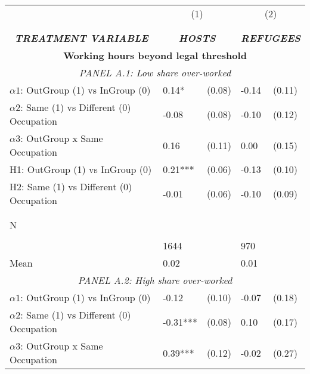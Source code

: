 \begin{tabular}{l*{4}{l}} \toprule 
                &\multicolumn{2}{c}{(1)}&\multicolumn{2}{c}{(2)}\\
                &\multicolumn{2}{c}{ } &\multicolumn{2}{c}{ } \\
\\[-0.6cm] \multicolumn{1}{c}{\textit{\textbf{TREATMENT VARIABLE}}} & \multicolumn{2}{c}{\textit{\textbf{HOSTS}}} & \multicolumn{2}{c}{\textit{\textbf{REFUGEES}}} \\ \midrule   \multicolumn{5}{c}{\textbf{Working hours beyond legal threshold}} \\ \multicolumn{5}{c}{\textit{PANEL A.1: Low share over-worked}} \\  \midrule  
$\alpha1$: OutGroup (1) vs InGroup (0)&     0.14*  &   (0.08)&    -0.14   &   (0.11)\\
$\alpha2$: Same (1) vs Different (0) Occupation&    -0.08   &   (0.08)&    -0.10   &   (0.12)\\
 
$\alpha3$: OutGroup x Same Occupation&     0.16   &   (0.11)&     0.00   &   (0.15)\\
 
H1: OutGroup (1) vs InGroup (0)&     0.21***&   (0.06)&    -0.13   &   (0.10)\\
 
H2: Same (1) vs Different (0) Occupation&    -0.01   &   (0.06)&    -0.10   &   (0.09)\\
 
  \\\\[-0.5cm] N \\\\[-0.6cm]&     1644   &         &      970   &         \\
Mean            &     0.02&         &     0.01&         \\
 
  \multicolumn{5}{c}{\textit{PANEL A.2: High share over-worked}} \\  \midrule  
$\alpha1$: OutGroup (1) vs InGroup (0)&       -0.12   &      (0.10)&       -0.07   &      (0.18)\\
$\alpha2$: Same (1) vs Different (0) Occupation&       -0.31***&      (0.08)&        0.10   &      (0.17)\\
 
$\alpha3$: OutGroup x Same Occupation&     0.39***&   (0.12)&    -0.02   &   (0.27)\\
 

\end{tabular}
